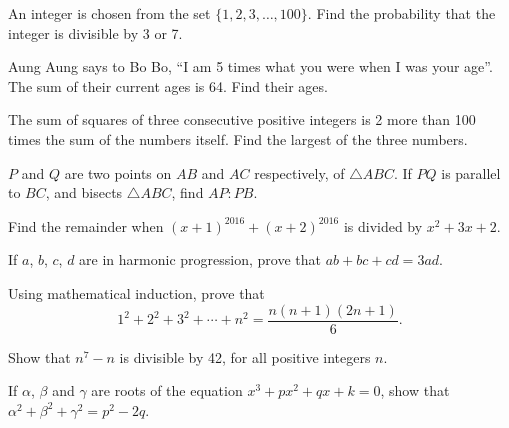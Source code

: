 \begin{problems}
    \problem An integer is chosen from the set $\{1, 2, 3, \ldots, 100\}$. Find
    the probability that the integer is divisible by 3 or 7.

    \problem Aung Aung says to Bo Bo, ``I am 5 times what you were when I was
    your age''.  The sum of their current ages is 64. Find their ages.

    \problem The sum of squares of three consecutive positive integers is 2 more
    than 100 times the sum of the numbers itself. Find the largest of the three
    numbers.

    \problem $P$ and $Q$ are two points on $AB$ and $AC$ respectively, of
    $\triangle ABC$. If $PQ$ is parallel to $BC$, and bisects $\triangle ABC$,
    find $AP : PB$.

    \problem Find the remainder when $(x + 1)^{2016} + (x + 2)^{2016}$ is
    divided by $x^2 + 3x + 2$.

    \problem If $a$, $b$, $c$, $d$ are in harmonic progression, prove that $ab +
    bc + cd = 3ad$.

    \problem Using mathematical induction, prove that 
    \[1^2 + 2^2 + 3^2 + \cdots + n^2 = \frac{n(n + 1)(2n + 1)}{6}.\]

    \problem Show that $n^7 - n$ is divisible by 42, for all positive integers
    $n$.

    \problem If $\alpha$, $\beta$ and $\gamma$ are roots of the equation $x^3 +
    px^2 + qx + k = 0$, show that $\alpha^2 + \beta^2 + \gamma^2 = p^2 - 2q$.
\end{problems}
